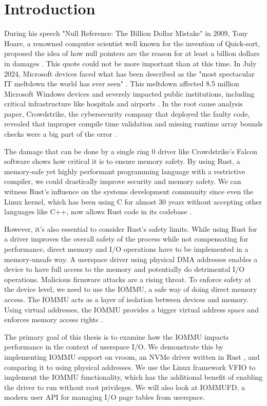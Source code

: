 \chapter{Introduction}\label{c:introduction}

During his speech "Null Reference: The Billion Dollar Mistake" in 2009, Tony Hoare, a renowned computer scientist well known for the invention of Quick-sort, proposed the idea of how null pointers are the reason for at least a billion dollars in damages \cite{billiondollarmistake}. This quote could not be more important than at this time. In July 2024, Microsoft devices faced what has been described as the "most spectacular IT meltdown the world has ever seen" \cite{bloombergmeltdown}. This meltdown affected 8.5 million Microsoft Windows devices and severely impacted public institutions, including critical infrastructure like hospitals and airports \cite{bloomberg8milliondevices}. In the root cause analysis paper, Crowdstrike, the cybersecurity company that deployed the faulty code, revealed that improper compile time validation and missing runtime array bounds checks were a big part of the error \cite{crowdstrikerca}.

The damage that can be done by a single ring 0 driver like Crowdstrike's Falcon software shows how critical it is to ensure memory safety. By using Rust, a memory-safe yet highly performant programming language with a restrictive compiler, we could drastically improve security and memory safety. We can witness Rust's influence on the systems development community since even the Linux kernel, which has been using C for almost 30 years without accepting other languages like C++, now allows Rust code in its codebase \cite{linuxrustpull}.

However, it's also essential to consider Rust's safety limits. While using Rust for a driver improves the overall safety of the process while not compensating for performance, direct memory and I/O operations have to be implemented in a memory-unsafe way. A userspace driver using physical DMA addresses enables a device to have full access to the memory and potentially do detrimental I/O operations. Malicious firmware attacks are a rising threat.
To enforce safety at the device level, we need to use the IOMMU, a safe way of doing direct memory access. The IOMMU acts as a layer of isolation between devices and memory. Using virtual addresses, the IOMMU provides a bigger virtual address space and enforces memory access rights \cite{OLS2007}.

The primary goal of this thesis is to examine how the IOMMU impacts performance in the context of userspace I/O.
We demonstrate this by implementing IOMMU support on vroom, an NVMe driver written in Rust \cite{vroom}, and comparing it to using physical addresses. We use the Linux framework VFIO to implement the IOMMU functionality, which has the additional benefit of enabling the driver to run without root privileges. We will also look at IOMMUFD, a modern user API for managing I/O page tables from userspace.
